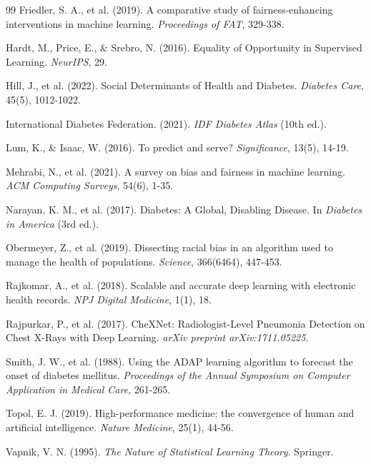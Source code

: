\documentclass[12pt,a4paper]{article}
\begin{document}
\begin{thebibliography}{99}
Friedler, S. A., et al. (2019). A comparative study of fairness-enhancing 
interventions in machine learning. \textit{Proceedings of FAT}, 329-338.

Hardt, M., Price, E., \& Srebro, N. (2016). Equality of Opportunity in 
Supervised Learning. \textit{NeurIPS}, 29.

Hill, J., et al. (2022). Social Determinants of Health and Diabetes. 
\textit{Diabetes Care}, 45(5), 1012-1022.

International Diabetes Federation. (2021). \textit{IDF Diabetes Atlas} 
(10th ed.).

Lum, K., \& Isaac, W. (2016). To predict and serve? \textit{Significance}, 
13(5), 14-19.

Mehrabi, N., et al. (2021). A survey on bias and fairness in machine learning. 
\textit{ACM Computing Surveys}, 54(6), 1-35.

Narayan, K. M., et al. (2017). Diabetes: A Global, Disabling Disease. In 
\textit{Diabetes in America} (3rd ed.).

Obermeyer, Z., et al. (2019). Dissecting racial bias in an algorithm used to 
manage the health of populations. \textit{Science}, 366(6464), 447-453.

Rajkomar, A., et al. (2018). Scalable and accurate deep learning with 
electronic health records. \textit{NPJ Digital Medicine}, 1(1), 18.

Rajpurkar, P., et al. (2017). CheXNet: Radiologist-Level Pneumonia Detection 
on Chest X-Rays with Deep Learning. \textit{arXiv preprint 
arXiv:1711.05225}.

Smith, J. W., et al. (1988). Using the ADAP learning algorithm to forecast 
the onset of diabetes mellitus. \textit{Proceedings of the Annual Symposium 
on Computer Application in Medical Care}, 261-265.

Topol, E. J. (2019). High-performance medicine: the convergence of human and 
artificial intelligence. \textit{Nature Medicine}, 25(1), 44-56.

Vapnik, V. N. (1995). \textit{The Nature of Statistical Learning Theory}. 
Springer.

\end{thebibliography}
\end{document}

